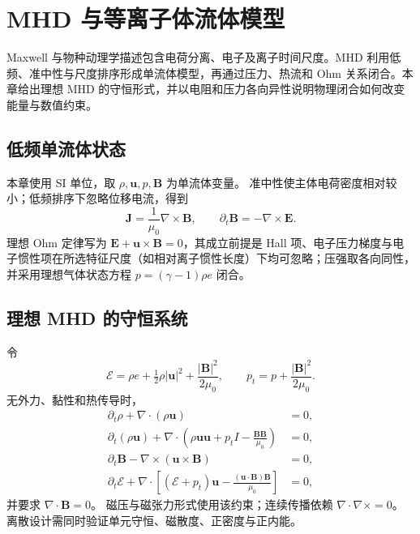 \chapter{MHD 与等离子体流体模型}\label{ch:18}
\begin{chaptersummary}
Maxwell 与物种动理学描述包含电荷分离、电子及离子时间尺度。MHD 利用低频、准中性与尺度排序形成单流体模型，再通过压力、热流和 Ohm 关系闭合。本章给出理想 MHD 的守恒形式，并以电阻和压力各向异性说明物理闭合如何改变能量与数值约束。
\end{chaptersummary}

\section{低频单流体状态}
本章使用 SI 单位，取 $\rho,\bm u,p,\bm B$ 为单流体变量。
准中性使主体电荷密度相对较小；低频排序下忽略位移电流，得到
\[
\bm J=\frac1{\mu_0}\nabla\times\bm B,\qquad
\partial_t\bm B=-\nabla\times\bm E.
\]
理想 Ohm 定律写为 $\bm E+\bm u\times\bm B=0$，其成立前提是 Hall 项、电子压力梯度与电子惯性项在所选特征尺度（如相对离子惯性长度）下均可忽略；压强取各向同性，并采用理想气体状态方程 $p=(\gamma-1)\rho e$ 闭合。

\section{理想 MHD 的守恒系统}
令
\[
\mathcal E=\rho e+\tfrac12\rho|\bm u|^2+\frac{|\bm B|^2}{2\mu_0},
\qquad p_t=p+\frac{|\bm B|^2}{2\mu_0}.
\]
无外力、黏性和热传导时，
\begin{equation}\label{eq:ideal-mhd}
\begin{aligned}
\partial_t\rho+\nabla\cdot(\rho\bm u)&=0,\\
\partial_t(\rho\bm u)+\nabla\cdot
\left(\rho\bm u\bm u+p_tI-\frac{\bm B\bm B}{\mu_0}\right)&=0,\\
\partial_t\bm B-\nabla\times(\bm u\times\bm B)&=0,\\
\partial_t\mathcal E+\nabla\cdot
\left[(\mathcal E+p_t)\bm u-\frac{(\bm u\cdot\bm B)\bm B}{\mu_0}\right]&=0,
\end{aligned}
\end{equation}
并要求 $\nabla\cdot\bm B=0$。
磁压与磁张力形式使用该约束；连续传播依赖 $\nabla\cdot\nabla\times=0$。
离散设计需同时验证单元守恒、磁散度、正密度与正内能。

